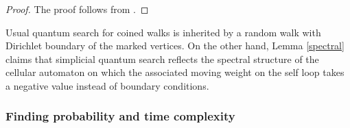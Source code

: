 \documentclass[a4paper,12pt]{article}
\numberwithin{equation}{section}
\begin{document}
\begin{proof}
The proof follows from \cite{MOSIIS}. 
\end{proof}
%
Usual quantum search for coined walks is inherited by a random walk with Dirichlet boundary of the marked vertices. 
On the other hand, Lemma \ref{spectral} claims that simplicial quantum search reflects the spectral structure of the cellular automaton 
on which the associated moving weight on the self loop takes a negative value instead of boundary conditions. 



\subsubsection{Finding probability and time complexity}
\end{document}
